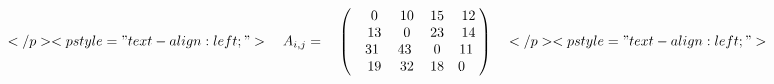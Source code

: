 \documentclass[12pt]{article}
\begin{document}
$ </p>
<p style="text-align: left;">\begin{equation*}    A_{i,j} =     \begin{pmatrix}    0 & 10 & 15 & 12 \\    13 & 0 & 23 & 14 \\    31  & 43  & 0 & 11  \\    19 & 32 & 18 & 0     \end{pmatrix}    \end{equation*}</p>
<p style="text-align: left;"> $
\end{document}
